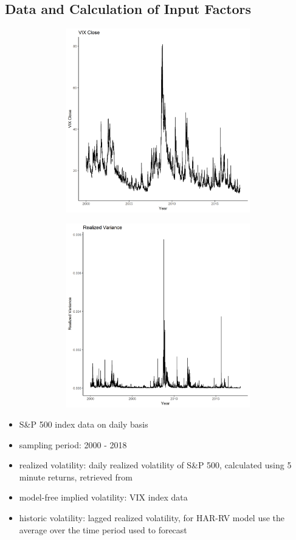 \subsection{Data and Calculation of Input Factors}
\begin{figure}[!htbp]
\includegraphics[width=16cm, height=8cm]{pictures/vix.png}
\end{figure}
%
\begin{figure}[!htbp]
\includegraphics[width=16cm, height=8cm]{pictures/var.png}
\end{figure}


%
%
\begin{itemize}\itemsep0pt
\item S\&P 500 index data on daily basis
\item sampling period: 2000 - 2018
\item realized volatility: daily realized volatility of S\&P 500, calculated using 5 minute returns, retrieved from \citeauthor{heber2009}
\item model-free implied volatility: VIX index data
\item historic volatility: lagged realized volatility, for HAR-RV model use the average over the time period used to forecast
\end{itemize}
